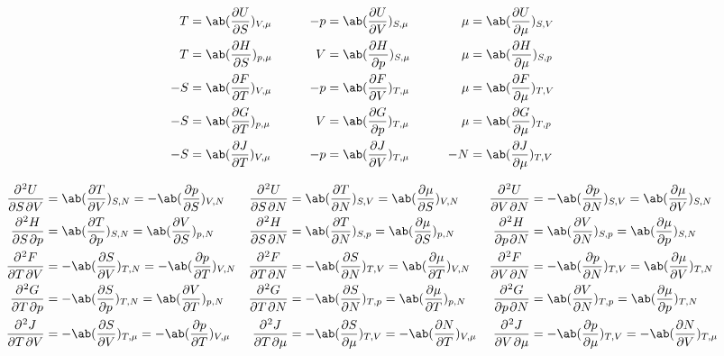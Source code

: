\documentclass[uplatex,diffipdfmx,a4paper,11pt]{jlreq}
\numberwithin{equation}{section}
\theoremstyle{definition}
\begin{document}
\begin{theorem}
  \begin{alignat}{5}
    T  & = \ab(\diffp{U}{S})_{V,\mu} & \qquad -p & = \ab(\diffp{U}{V})_{S,\mu} & \qquad \mu & = \ab(\diffp{U}{\mu})_{S,V} \\
    T  & = \ab(\diffp{H}{S})_{p,\mu} & \qquad V  & = \ab(\diffp{H}{p})_{S,\mu} & \qquad \mu & = \ab(\diffp{H}{\mu})_{S,p} \\
    -S & = \ab(\diffp{F}{T})_{V,\mu} & \qquad -p & = \ab(\diffp{F}{V})_{T,\mu} & \qquad \mu & = \ab(\diffp{F}{\mu})_{T,V} \\
    -S & = \ab(\diffp{G}{T})_{p,\mu} & \qquad V  & = \ab(\diffp{G}{p})_{T,\mu} & \qquad \mu & = \ab(\diffp{G}{\mu})_{T,p} \\
    -S & = \ab(\diffp{J}{T})_{V,\mu} & \qquad -p & = \ab(\diffp{J}{V})_{T,\mu} & \qquad -N  & = \ab(\diffp{J}{\mu})_{T,V}
  \end{alignat}
\end{theorem}

\begin{proposition}
  \begin{align*}
    \diffp{U}{S,V} & = \ab(\diffp{T}{V})_{S,N} = -\ab(\diffp{p}{S})_{V,N}      & \diffp{U}{S,N}   & = \ab(\diffp{T}{N})_{S,V} = \ab(\diffp{\mu}{S})_{V,N}     & \diffp{U}{V,N}   & = -\ab(\diffp{p}{N})_{S,V} = \ab(\diffp{\mu}{V})_{S,N}    \\
    \diffp{H}{S,p} & = \ab(\diffp{T}{p})_{S,N} = \ab(\diffp{V}{S})_{p,N}       & \diffp{H}{S,N}   & = \ab(\diffp{T}{N})_{S,p} = \ab(\diffp{\mu}{S})_{p,N}     & \diffp{H}{p,N}   & = \ab(\diffp{V}{N})_{S,p} = \ab(\diffp{\mu}{p})_{S,N}     \\
    \diffp{F}{T,V} & = -\ab(\diffp{S}{V})_{T,N} = -\ab(\diffp{p}{T})_{V,N}     & \diffp{F}{T,N}   & = -\ab(\diffp{S}{N})_{T,V} = \ab(\diffp{\mu}{T})_{V,N}    & \diffp{F}{V,N}   & = -\ab(\diffp{p}{N})_{T,V} = \ab(\diffp{\mu}{V})_{T,N}    \\
    \diffp{G}{T,p} & = -\ab(\diffp{S}{p})_{T,N} = \ab(\diffp{V}{T})_{p,N}      & \diffp{G}{T,N}   & = -\ab(\diffp{S}{N})_{T,p} = \ab(\diffp{\mu}{T})_{p,N}    & \diffp{G}{p,N}   & = \ab(\diffp{V}{N})_{T,p} = \ab(\diffp{\mu}{p})_{T,N}     \\
    \diffp{J}{T,V} & = -\ab(\diffp{S}{V})_{T,\mu} = -\ab(\diffp{p}{T})_{V,\mu} & \diffp{J}{T,\mu} & = -\ab(\diffp{S}{\mu})_{T,V} = -\ab(\diffp{N}{T})_{V,\mu} & \diffp{J}{V,\mu} & = -\ab(\diffp{p}{\mu})_{T,V} = -\ab(\diffp{N}{V})_{T,\mu}
  \end{align*}
\end{proposition}
\end{document}
